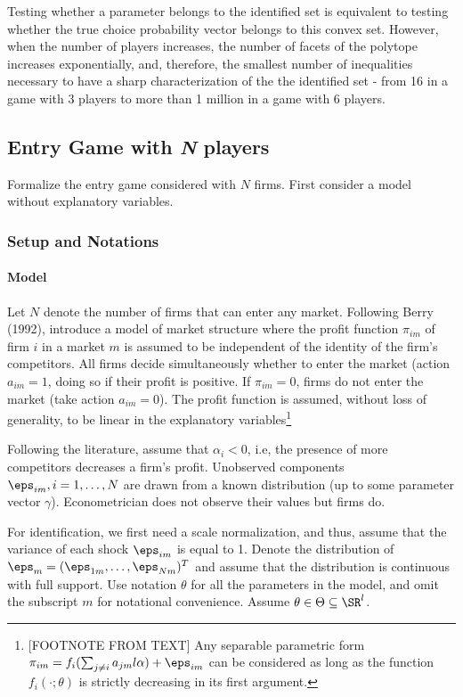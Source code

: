 Testing whether a parameter belongs to the identified set is equivalent to testing whether the true choice probability vector belongs to this convex set. However, when the number of players increases, the number of facets of the polytope increases exponentially, and, therefore, the smallest number of inequalities necessary to have a sharp characterization of the the identified set - from 16 in a game with 3 players to more than 1 million in a game with 6 players.

\subsection{Entry Game with \emph{N} players}

Formalize the entry game considered with $N$ firms. First consider a model without explanatory variables.

\subsubsection{Setup and Notations}

\paragraph{Model}
Let $N$ denote the number of firms that can enter any market. Following Berry (1992), introduce a model of market structure where the profit function $\pi_{im}$ of firm $i$ in a market $m$ is assumed to be independent of the identity of the firm's competitors. All firms decide simultaneously whether to enter the market (action \(a_{im} = 1\), doing so if their profit is positive. If $\pi_{im} = 0$, firms do not enter the market (take action \(a_{im}= 0\)). The profit function is assumed, without loss of generality, to be linear in the explanatory variables\footnote{[FOOTNOTE FROM TEXT] Any separable parametric form $\pi_{im} = f_i(\sum_{j\neq i} a_{jm}l\alpha) + \eps_{im}$ can be considered as long as the function $f_i(\cdot;\theta)$ is strictly decreasing in its first argument.}

Following the literature, assume that $\alpha_i < 0$, i.e, the presence of more competitors decreases a firm's profit. Unobserved components $\eps_{im}, i = 1,\dots, N$ are drawn from a known distribution (up to some parameter vector $\gamma$). Econometrician does not observe their values but firms do.

For identification, we first need a scale normalization, and thus, assume that the variance of each shock $\eps_{im}$ is equal to 1. Denote the distribution of $\eps_m = (\eps_{1m},\dots, \eps_{Nm})^T$ and assume that the distribution is continuous with full support. Use notation $\theta$ for all the parameters in the model, and omit the subscript $m$ for notational convenience. Assume $\theta \in \Theta \subseteq \SR^l$. 

